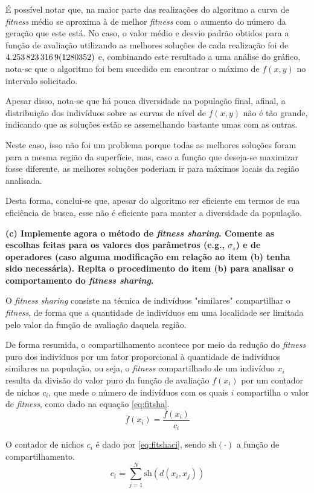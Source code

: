\documentclass[a4paper, 12pt]{article}
\newcommand{\fitness}{\textit{fitness}\xspace}
\newcommand{\fitsha}{\textit{fitness sharing}\xspace}
\newcommand{\sh}{\text{sh}\xspace}
\begin{document}
É possível notar que, na maior parte das realizações do algoritmo a curva de \fitness médio se aproxima à de melhor \fitness com o aumento do número da geração que este está. No caso, o valor médio e desvio padrão obtidos para a função de avaliação utilizando as melhores soluções de cada realização foi de $\num{4.2538233169\pm 0.0001280352}$ e, combinando este resultado a uma análise do gráfico, nota-se que o algoritmo foi bem sucedido em encontrar o máximo de $f(x,y)$ no intervalo solicitado.

Apesar disso, nota-se que há pouca diversidade na população final, afinal, a distri\-buição dos indivíduos sobre as curvas de nível de $f(x,y)$ não é tão grande, indicando que as soluções estão se assemelhando bastante umas com as outras.

Neste caso, isso não foi um problema porque todas as melhores soluções foram para a mesma região da superfície, mas, caso a função que deseja-se maximizar fosse diferente, as melhores soluções poderiam ir para máximos locais da região analisada.

Desta forma, conclui-se que, apesar do algoritmo ser eficiente em termos de sua eficiência de busca, esse não é eficiente para manter a diversidade da população. 

\textbf{(c) Implemente agora o método de \fitsha. Comente as escolhas feitas para os valores dos parâmetros (e.g., $\sigma_s$) e de operadores (caso alguma modificação em relação ao item (b) tenha sido necessária). Repita o procedimento do item (b) para analisar o comportamento do \fitsha.}

O \fitsha consiste na técnica de indivíduos "similares" compartilhar o \fitness, de forma que a quantidade de indivíduos em uma localidade ser limitada pelo valor da função de avaliação daquela região.

De forma resumida, o compartilhamento acontece por meio da redução do \fitness puro dos indivíduos por um fator proporcional à quantidade de indivíduos similares na população, ou seja, o \fitness compartilhado de um indivíduo $x_i$ resulta da divisão do valor puro da função de avaliação $f(x_i)$ por um contador de nichos $c_i$, que mede o número de indivíduos com os quais $i$ compartilha o valor de \fitness, como dado na equação  \ref{eq:fitsha}.
\begin{equation}\label{eq:fitsha}
    \overline{f} (x_i) = \frac{f(x_i)}{c_i}
\end{equation}

O contador de nichos $c_i$ é dado por \ref{eq:fitshaci}, sendo $\sh(\cdot)$ a função de compartilhamento.
\begin{equation}\label{eq:fitshaci}
    c_i = \sum_{j=1}^N \sh (d(x_i, x_j))
\end{equation}
\end{document}
